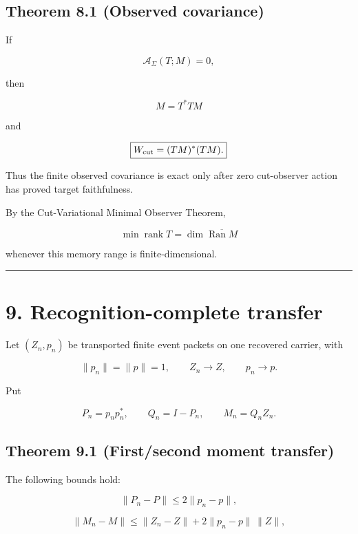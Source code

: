 \hypertarget{theorem-8.1-observed-covariance}{%
\subsection{Theorem 8.1 (Observed covariance)}\label{theorem-8.1-observed-covariance}}

If

\[
\mathcal A_\Sigma(T;M)=0,
\]

then

\[
M=T^*TM
\]

and

\[
\boxed{
W_{\rm cut}
=(TM)^*(TM).
}
\]

Thus the finite observed covariance is exact only after zero cut-observer
action has proved target faithfulness.

By the Cut-Variational Minimal Observer Theorem,

\[
\min\operatorname{rank}T
=\dim\overline{\operatorname{Ran}M}
\]

whenever this memory range is finite-dimensional.

\begin{center}\rule{0.5\linewidth}{0.5pt}\end{center}

\hypertarget{recognition-complete-transfer}{%
\section{9. Recognition-complete transfer}\label{recognition-complete-transfer}}

Let \((Z_n,p_n)\) be transported finite event packets on one recovered carrier,
with

\[
\|p_n\|=\|p\|=1,
\qquad
Z_n\to Z,
\qquad
p_n\to p.
\]

Put

\[
P_n=p_np_n^*,
\qquad
Q_n=I-P_n,
\qquad
M_n=Q_nZ_n.
\]

\hypertarget{theorem-9.1-firstsecond-moment-transfer}{%
\subsection{Theorem 9.1 (First/second moment transfer)}\label{theorem-9.1-firstsecond-moment-transfer}}

The following bounds hold:

\[
\boxed{
\|P_n-P\|
\le2\|p_n-p\|,
}
\]

\[
\boxed{
\|M_n-M\|
\le
\|Z_n-Z\|
+2\|p_n-p\|\,\|Z\|,
}
\]

